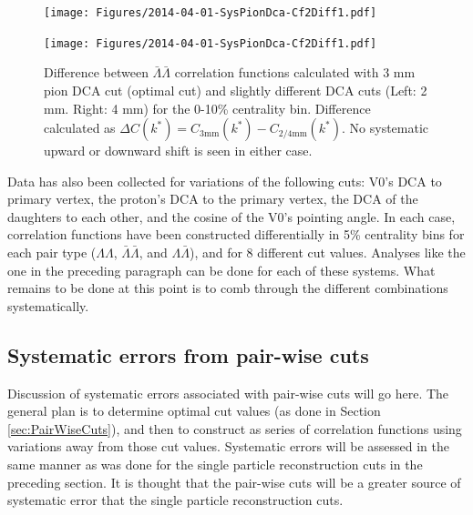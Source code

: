 \begin{figure}[h]
\begin{minipage}{18pc}

\texttt{[image: Figures/2014-04-01-SysPionDca-Cf2Diff1.pdf]}
\end{minipage}\hspace{2pc}
\begin{minipage}{18pc}
\texttt{[image: Figures/2014-04-01-SysPionDca-Cf2Diff1.pdf]}
\end{minipage} 
\caption[$\Delta C(k^*)$ for $\bar{\Lambda}\bar{\Lambda}$ correlation functions with different pion DCA cuts]{Difference between $\bar{\Lambda}\bar{\Lambda}$ correlation functions calculated with 3 mm pion DCA cut (optimal cut) and slightly different DCA cuts (Left: 2 mm.  Right: 4 mm) for the 0-10\% centrality bin.  Difference calculated as $\Delta C(k^*) = C_{3 \mathrm{mm}}(k^*)-C_{2/4 \mathrm{mm}}(k^*)$.  No systematic upward or downward shift is seen in either case.}
\label{fig:SysPionDcaCf2Diff13}
\end{figure}

Data has also been collected for variations of the following cuts: V0's DCA to primary vertex, the proton's DCA to the primary vertex, the DCA of the daughters to each other, and the cosine of the V0's pointing angle.  In each case, correlation functions have been constructed differentially in 5\% centrality bins for each pair type ($\Lambda\Lambda$, $\bar{\Lambda}\bar{\Lambda}$, and $\Lambda\bar{\Lambda}$), and for 8 different cut values.  Analyses like the one in the preceding paragraph can be done for each of these systems.  What remains to be done at this point is to comb through the different combinations systematically.



\subsection{Systematic errors from pair-wise cuts}
\label{sec:SystematicsPairWise}

Discussion of systematic errors associated with pair-wise cuts will go here.  The general plan is to determine optimal cut values (as done in Section \ref{sec:PairWiseCuts}), and then to construct as series of correlation functions using variations away from those cut values.  Systematic errors will be assessed in the same manner as was done for the single particle reconstruction cuts in the preceding section.  It is thought that the pair-wise cuts will be a greater source of systematic error that the single particle reconstruction cuts.


